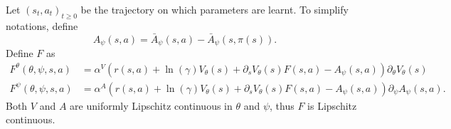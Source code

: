 Let $(s_t, a_t)_{t\geq 0}$ be the trajectory on which parameters are
learnt. To simplify notations, define
\begin{equation}
	A_\psi(s, a) = \bar{A}_\psi(s, a) - \bar{A}_\psi(s, \pi(s)).
\end{equation}
Define $F$ as
\begin{align}
	F^\theta(\theta, \psi, s, a) &= \alpha^V (r(s, a) + \ln(\gamma) V_\theta(s) + \partial_s V_\theta(s) F(s, a) - A_\psi(s, a))\partial_\theta V_\theta(s)\\
	F^\psi(\theta, \psi, s, a) &= \alpha^A (r(s, a) + \ln(\gamma) V_\theta(s) + \partial_s V_\theta(s) F(s, a) - A_\psi(s, a))\partial_\psi A_\psi(s, a).
\end{align}
Both $V$ and $A$ are uniformly Lipschitz continuous in $\theta$ and $\psi$, thus
$F$ is Lipschitz continuous. 

